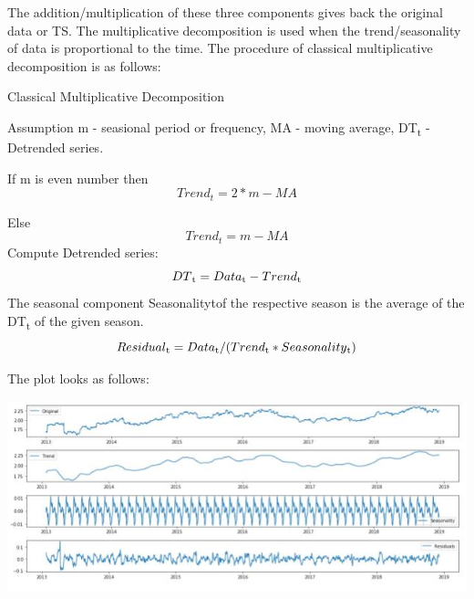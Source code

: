 			The addition/multiplication of these three components gives back the original data or TS. The multiplicative decomposition is used when the trend/seasonality of data is proportional to the time.
			The procedure of classical multiplicative decomposition is as follows:

				\begin{algorithm}[H]
					\caption{Classical Multiplicative Decomposition}
					Assumption m - seasional period or frequency, 
	        						MA - moving average, 
	       						DT\textsubscript{t} - Detrended series.

					\begin{algorithmic}[1] 
						\STATE If m is even number then \begin{equation}Trend_{t} = 2 * m-MA		\end{equation}

								Else \begin{equation}Trend_{t} = m-MA	\end{equation}
						\STATE Compute Detrended series:
									\begin{equation}DT\textsubscript{t} = Data\textsubscript{t} - Trend\textsubscript{t} \end{equation}
						\STATE The seasonal component Seasonalitytof the respective season is the average of the DT\textsubscript{t} of the given season.
						\STATE \begin{equation}Residual\textsubscript{t} = Data\textsubscript{t} / (Trend\textsubscript{t}  * Seasonality\textsubscript{t})	\end{equation}
					\end{algorithmic}
				\end{algorithm}

			The plot looks as follows:
				
				\begin{center}
				\includegraphics[width=\linewidth]{figures/The-trend-seasonality-and-residual-of-log-transformed-data.jpg}	
				\label{fig: The trend, seasonality and residual of log-transformed data}
				\end{center}

